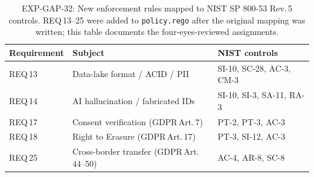 \begin{table}[t]
\centering
\small
\caption{EXP-GAP-32: New enforcement rules mapped to NIST SP 800-53 Rev.\,5 controls.
  REQ\,13--25 were added to \texttt{policy.rego} after the original mapping was written;
  this table documents the four-eyes-reviewed assignments.}
\label{tab:gap32-new-reqs}
\begin{tabular}{lll}
\hline
\textbf{Requirement} & \textbf{Subject} & \textbf{NIST controls} \\
\hline
REQ\,13 & Data-lake format / ACID / PII    & SI-10, SC-28, AC-3, CM-3 \\
REQ\,14 & AI hallucination / fabricated IDs & SI-10, SI-3, SA-11, RA-3 \\
REQ\,17 & Consent verification (GDPR\,Art.\,7) & PT-2, PT-3, AC-3 \\
REQ\,18 & Right to Erasure (GDPR\,Art.\,17)   & PT-3, SI-12, AC-3 \\
REQ\,25 & Cross-border transfer (GDPR\,Art.\,44--50) & AC-4, AR-8, SC-8 \\
\hline
\end{tabular}
\end{table}

